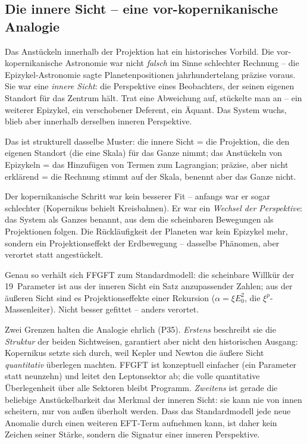 \subsection*{Die innere Sicht -- eine vor-kopernikanische Analogie}

Das Anstückeln innerhalb der Projektion hat ein historisches Vorbild. Die
vor-kopernikanische Astronomie war nicht \emph{falsch} im Sinne schlechter
Rechnung -- die Epizykel-Astronomie sagte Planetenpositionen jahrhundertelang
präzise voraus. Sie war eine \emph{innere Sicht}: die Perspektive eines
Beobachters, der seinen eigenen Standort für das Zentrum hält. Trat eine
Abweichung auf, stückelte man an -- ein weiterer Epizykel, ein verschobener
Deferent, ein Äquant. Das System wuchs, blieb aber innerhalb derselben
inneren Perspektive.

Das ist strukturell dasselbe Muster: die innere Sicht = die Projektion, die
den eigenen Standort (die eine Skala) für das Ganze nimmt; das Anstückeln von
Epizykeln = das Hinzufügen von Termen zum Lagrangian; präzise, aber nicht
erklärend = die Rechnung stimmt auf der Skala, benennt aber das Ganze nicht.

Der kopernikanische Schritt war kein besserer Fit -- anfangs war er sogar
schlechter (Kopernikus behielt Kreisbahnen). Er war ein \emph{Wechsel der
Perspektive}: das System als Ganzes benannt, aus dem die scheinbaren
Bewegungen als Projektionen folgen. Die Rückläufigkeit der Planeten war kein
Epizykel mehr, sondern ein Projektionseffekt der Erdbewegung -- dasselbe
Phänomen, aber verortet statt angestückelt.

Genau so verhält sich FFGFT zum Standardmodell: die scheinbare Willkür der
19~Parameter ist aus der inneren Sicht ein Satz anzupassender Zahlen; aus der
äußeren Sicht sind es Projektionseffekte einer Rekursion ($\alpha = \xi
E_0^2$, die $\xi^p$-Massenleiter). Nicht besser gefittet -- anders verortet.

Zwei Grenzen halten die Analogie ehrlich (P35). \emph{Erstens} beschreibt sie
die \emph{Struktur} der beiden Sichtweisen, garantiert aber nicht den
historischen Ausgang: Kopernikus setzte sich durch, weil Kepler und Newton die
äußere Sicht \emph{quantitativ} überlegen machten. FFGFT ist konzeptuell
einfacher (ein Parameter statt neunzehn) und leitet den Leptonsektor ab; die
volle quantitative Überlegenheit über alle Sektoren bleibt Programm.
\emph{Zweitens} ist gerade die beliebige Anstückelbarkeit das Merkmal der
inneren Sicht: sie kann nie von innen scheitern, nur von außen überholt
werden. Dass das Standardmodell jede neue Anomalie durch einen weiteren
EFT-Term aufnehmen kann, ist daher kein Zeichen seiner Stärke, sondern die
Signatur einer inneren Perspektive.

